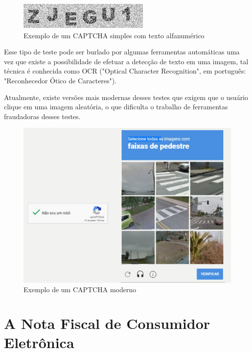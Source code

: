 \begin{figure}[h]
    \centering
    \includegraphics[scale=0.5]{tcc/figures/captcha/captcha-alfanumerico.png}
    \caption{Exemplo de um CAPTCHA simples com texto alfanumérico}
    \label{fig-exemplo-captcha-alfanumerico}
\end{figure}

Esse tipo de teste pode ser burlado por algumas ferramentas automáticas uma vez que existe a possibilidade de efetuar a detecção de texto em uma imagem, tal técnica é conhecida como OCR ("Optical Character Recognition", em português: "Reconhecedor Ótico de Caracteres").

Atualmente, existe versões mais modernas desses testes que exigem que o usuário clique em uma imagem aleatória, o que dificulta o trabalho de ferramentas fraudadoras desses testes.

\begin{figure}[h]
    \centering
    \includegraphics[scale=0.15]{tcc/figures/captcha/recaptcha-post-g1.jpg}
    \caption{Exemplo de um CAPTCHA moderno}
    \label{fig-exemplo-captcha-alfanumerico}
\end{figure}

\section{A Nota Fiscal de Consumidor Eletrônica}\label{secNfce}

